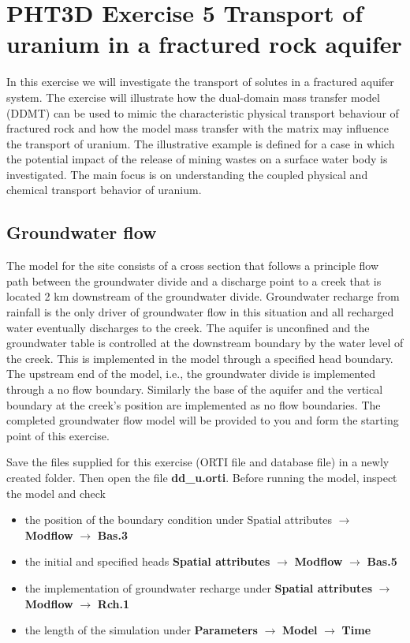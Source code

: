 \section[PHT3D Exercise 5 Transport of uranium in a fractured rock aquifer]{PHT3D Exercise 5 Transport of uranium in a fractured rock aquifer}

In this exercise we will investigate the transport of solutes 
in a fractured aquifer system. The exercise will illustrate 
how the dual-domain mass transfer model (DDMT) can be used to mimic the
characteristic physical transport behaviour of fractured rock
and how the model mass transfer with the matrix may influence 
the transport of uranium. The illustrative example
is defined for a case in which the potential impact of 
the release of mining wastes on a surface water body 
is investigated. The main focus is on understanding the 
coupled physical and chemical transport behavior of uranium.        

\subsection{Groundwater flow}

The model for the site consists of a cross section that follows 
a principle flow path between the groundwater divide and 
a discharge point to a creek that is located 2 km downstream of the 
groundwater divide. Groundwater recharge from rainfall is the only 
driver of groundwater flow in this situation and all recharged 
water eventually discharges to the creek. 
The aquifer is unconfined and the groundwater table 
is controlled at the downstream boundary by the water level of the creek.
This is implemented in the model through a specified head boundary. 
The upstream end of the model, i.e., the groundwater divide is implemented
through a no flow boundary. Similarly the base of the aquifer and the
vertical boundary at the creek's position are implemented 
as no flow boundaries. The completed groundwater flow model 
will be provided to you and form the starting point of this exercise.

Save the files supplied for this exercise 
(ORTI file and database file) in a newly created 
folder. Then open the file  {\color{red}\textbf{dd\_u.orti}}.
Before running the model, inspect the model and check
\begin{itemize}
\item the position of the boundary condition under 
{\color{blue}Spatial attributes} 
$\rightarrow$ {\color{blue}\textbf{Modflow}} 
$\rightarrow$ {\color{blue}\textbf{Bas.3}}
\item the initial and specified heads 
{\color{blue}\textbf{Spatial attributes}} 
$\rightarrow$ {\color{blue}\textbf{Modflow}} 
$\rightarrow$  {\color{blue}\textbf{Bas.5}}
\item the implementation of groundwater recharge under 
{\color{blue}\textbf{Spatial attributes}} 
$\rightarrow$ {\color{blue}\textbf{Modflow}} 
$\rightarrow$ {\color{blue}\textbf{Rch.1}}
\item the length of the simulation under 
{\color{blue}\textbf{Parameters}} 
$\rightarrow$ {\color{blue}\textbf{Model}}
$\rightarrow$ {\color{blue}\textbf{Time}}
\end{itemize}

